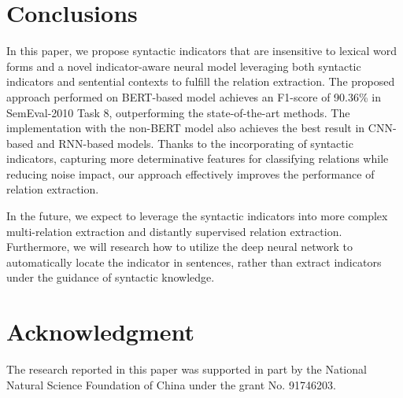 \documentclass[conference]{IEEEtran}
\begin{document}
\section{Conclusions}

In this paper, we propose syntactic indicators that are insensitive to lexical word forms and a novel indicator-aware neural model leveraging both syntactic indicators and sentential contexts to fulfill the relation extraction. The proposed approach performed on BERT-based model achieves an F1-score of 90.36\% in SemEval-2010 Task 8, outperforming the state-of-the-art methods. The implementation with the non-BERT model also achieves the best result in CNN-based and RNN-based models. Thanks to the incorporating of syntactic indicators, capturing more determinative features for classifying relations while reducing noise impact, our approach effectively improves the performance of relation extraction. 

In the future, we expect to leverage the syntactic indicators into more complex multi-relation extraction and distantly supervised relation extraction. Furthermore, we will research how to utilize the deep neural network to automatically locate the indicator in sentences, rather than extract indicators under the guidance of syntactic knowledge.

\section*{Acknowledgment}

The research reported in this paper was supported in part by the National Natural Science Foundation of China under the grant No. 91746203. 



\end{document}
